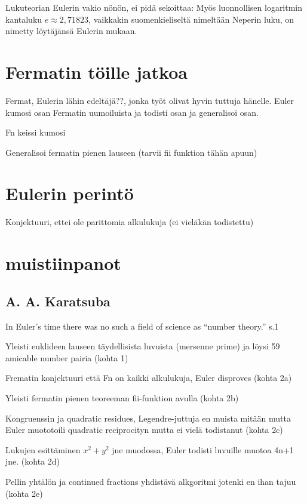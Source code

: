 \documentclass[a4paper,11pt]{article}
\begin{document}
Lukuteorian Eulerin vakio nönön, ei pidä sekoittaa:  Myös luonnollisen logaritmin kantaluku $e\approx2,71823$, vaikkakin suomenkieliseltä nimeltään Neperin luku, on nimetty löytäjänsä Eulerin mukaan.



\section{Fermatin töille jatkoa}

Fermat, Eulerin lähin edeltäjä??, jonka työt olivat hyvin tuttuja hänelle. Euler kumosi osan Fermatin uumoiluista ja todisti osan ja generalisoi osan.

Fn keissi kumosi

Generalisoi fermatin pienen lauseen (tarvii fii funktion tähän apuun)



\section{Eulerin perintö}

Konjektuuri, ettei ole parittomia alkulukuja (ei vieläkän todistettu)

\section{muistiinpanot}

\subsection{A. A. Karatsuba}

In Euler’s time there was no such a field of science as “number theory.” s.1

Yleisti euklideen lauseen täydellisista luvuista (mersenne prime) ja löysi 59 amicable number pairia (kohta 1)

Frematin konjektuuri että Fn on kaikki alkulukuja, Euler disproves (kohta 2a)

Yleisti fermatin pienen teoreeman fii-funktion avulla (kohta 2b)

Kongruenssin ja quadratic residues, Legendre-juttuja en muista mitään mutta Euler muototoili quadratic reciprocityn mutta ei vielä todistanut (kohta 2c)

Lukujen esittäminen $x^2+y^2$ jne muodossa, Euler todisti luvuille muotoa 4n+1 jne. (kohta 2d)

Pellin yhtälön ja continued fractions yhdistävä alkgoritmi jotenki en ihan tajuu (kohta 2e)
\end{document}
